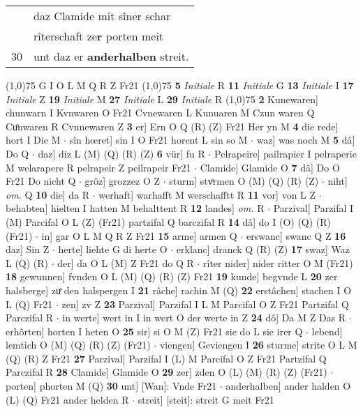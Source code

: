 \documentclass[8pt,a4paper,notitlepage]{article}
\begin{document}
\begin{table}[ht]
\begin{minipage}[t]{0.5\linewidth}
\begin{tabular}{rl}
 & daz Clamide mit sîner schar\\ 
 & rîterschaft ze\textbf{r} porten meit\\ 
30 & unt daz er \textbf{anderhalben} streit.\\ 
\end{tabular}
\scriptsize
\line(1,0){75} \newline
G I O L M Q R Z Fr21 \newline
\line(1,0){75} \newline
\textbf{5} \textit{Initiale} R  \textbf{11} \textit{Initiale} G  \textbf{13} \textit{Initiale} I  \textbf{17} \textit{Initiale} Z  \textbf{19} \textit{Initiale} M  \textbf{27} \textit{Initiale} L  \textbf{29} \textit{Initiale} R  \newline
\line(1,0){75} \newline
\textbf{2} Kunewaren] chunwarn I Kvnwaren O Fr21 Cvnewaren L Kunuaren M Czun waren Q Cuͦnwaren R Cvnnewaren Z \textbf{3} er] Ern O Q (R) (Z) Fr21 Her yn M \textbf{4} die rede] hort I Die M  $\cdot$ sîn hœret] sin I O Fr21 horent L sin so M  $\cdot$ waz] was noch M \textbf{5} dâ] Do Q  $\cdot$ daz] diz L (M) (Q) (R) (Z) \textbf{6} vür] fu R  $\cdot$ Pelrapeire] pailrapier I pelraperie M welarapere R pelrapeir Z peilrapeir Fr21  $\cdot$ Clamide] Glamide O \textbf{7} dâ] Do O Fr21 Do nicht Q  $\cdot$ grôz] grozzez O Z  $\cdot$ sturm] stvͦrmen O (M) (Q) (R) (Z)  $\cdot$ niht] \textit{om.} Q \textbf{10} die] da R  $\cdot$ werhaft] warhafft M werschafftt R \textbf{11} vor] von L Z  $\cdot$ behabten] hielten I hatten M behalttent R \textbf{12} landes] \textit{om.} R  $\cdot$ Parzival] Parzifal I (M) Parcifal O L (Z) (Fr21) partzifal Q barczifal R \textbf{14} dâ] do I (O) (Q) (R) (Fr21)  $\cdot$ in] gar O L M Q R Z Fr21 \textbf{15} arme] armen Q  $\cdot$ erswanc] swanc Q Z \textbf{16} daz] Sin Z  $\cdot$ herte] liehte G di herte O  $\cdot$ erklanc] dranck Q (R) (Z) \textbf{17} swaz] Waz L (Q) (R)  $\cdot$ der] da O L (M) Z Fr21 do Q R  $\cdot$ rîter nider] nider ritter O M (Fr21) \textbf{18} gewunnen] fvnden O L (M) (Q) (R) (Z) Fr21 \textbf{19} kunde] begvnde L \textbf{20} zer halsberge] zuͤ den halspergen I \textbf{21} râche] rachin M (Q) \textbf{22} erstâchen] stachen I O L (Q) Fr21  $\cdot$ zen] zv Z \textbf{23} Parzival] Parzifal I L M Parcifal O Z Fr21 Partzifal Q Parczifal R  $\cdot$ in werte] wert in I in wert O der werte in Z \textbf{24} dô] Da M Z Das R  $\cdot$ erhôrten] horten I heten O \textbf{25} sir] si O M (Z) Fr21 sie do L sie irer Q  $\cdot$ lebend] lemtich O (M) (Q) (R) (Z) (Fr21)  $\cdot$ viengen] Geviengen I \textbf{26} sturme] strite O L M (Q) (R) Z Fr21 \textbf{27} Parzival] Parzifal I (L) M Parcifal O Z Fr21 Partzifal Q Parczifal R \textbf{28} Clamide] Glamide O \textbf{29} zer] zden O (L) (M) (R) (Z) (Fr21)  $\cdot$ porten] phorten M (Q) \textbf{30} unt] [Wan]: Vnde Fr21  $\cdot$ anderhalben] ander halden O (L) (Q) Fr21 ander helden R  $\cdot$ streit] [steit]: streit G meit Fr21 \newline

\end{minipage}
\end{table}
\end{document}
